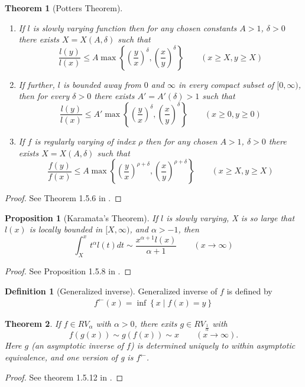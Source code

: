 \documentclass[10pt]{article}
\theoremstyle{plain}
\newtheorem{theorem}{Theorem}
\newtheorem{proposition}{Proposition}
\theoremstyle{definition}
\newtheorem{definition}{Definition}
\begin{document}
	\begin{theorem}[Potters Theorem]\label{PottersBound}
		\begin{enumerate}[label=(\roman*)]
			\item If $l$ is slowly varying function then for any chosen constants $A>1$, $\delta>0$ there exists $X=X(A, \delta)$ such that
			\[
			\frac{l(y)}{l(x)}\le A\max\left\{\left(\frac{y}{x}\right)^{\delta}, \left(\frac{x}{y}\right)^{\delta}\right\} \qquad (x\ge X, y\ge X)
			\]
			
			\item If further, $l$ is bounded away from $0$ and $\infty$ in every compact subset of $[0, \infty)$, then for every $\delta>0$ there exists $A'=A'(\delta)>1$ such that
			\[
			\frac{l(y)}{l(x)}\le A'\max\left\{\left(\frac{y}{x}\right)^{\delta}, \left(\frac{x}{y}\right)^{\delta}\right\} \qquad (x\ge 0, y\ge 0)
			\]
			
			\item If $f$ is regularly varying of index $\rho$ then for any chosen $A>1$, $\delta>0$ there exists $X=X(A, \delta)$ such that 
			\[
			\frac{f(y)}{f(x)}\le A\max\left\{\left(\frac{y}{x}\right)^{\rho+\delta}, \left(\frac{x}{y}\right)^{\rho+\delta}\right\} \qquad (x\ge X, y\ge X)
			\]
		\end{enumerate}
	\end{theorem}
	\begin{proof}
		See Theorem 1.5.6 in \cite{bingham1987regular}.
	\end{proof}
	
	\begin{proposition}[Karamata's Theorem]\label{karamata}
		If $l$ is slowly varying, X is so large that $l(x)$ is locally bounded in $[X, \infty)$, and $\alpha>-1$, then
		\[
		\int_{X}^{x} t^\alpha l(t)dt\sim \frac{x^{\alpha+1}l(x)}{\alpha+1}\qquad (x\to\infty)
		\]
	\end{proposition}
	\begin{proof}
		See Proposition 1.5.8 in \cite{bingham1987regular}.
	\end{proof}
	
	\begin{definition}[Generalized inverse]
		Generalized inverse of $f$ is defined by
		\begin{align}
			f^{\leftarrow}(x)=\inf\left\{x\mid f(x)=y\right\}
		\end{align}
	\end{definition}
	
	\begin{theorem}\label{RVinverse}
		If $f\in RV_\alpha$ with $\alpha>0$, there exits $g\in RV_{\frac{1}{\alpha}}$ with 
		\[
		f(g(x))\sim g(f(x))\sim x\qquad (x\to \infty).
		\]
		Here $g$ (an asymptotic inverse of $f$) is determined uniquely to within asymptotic equivalence, and one version of g is $f^{\leftarrow}$.
	\end{theorem}
	\begin{proof}
		See theorem 1.5.12 in \cite{bingham1987regular}.
	\end{proof}

	
	
	
\end{document}
